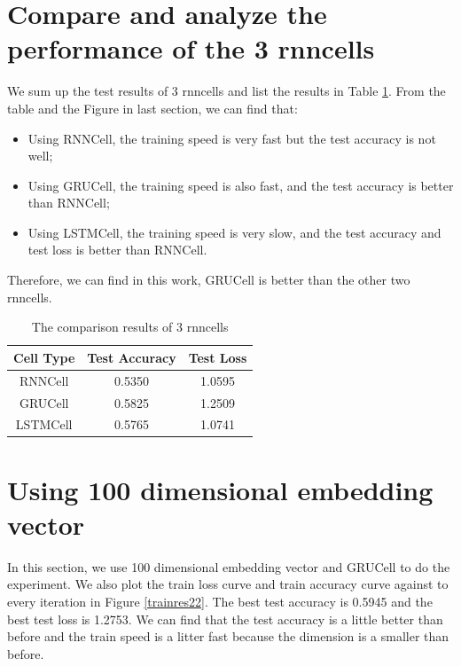 \documentclass{elegantbook}
\begin{document}

\section{Compare and analyze the performance of the 3 rnncells}
We sum up the test results of 3 rnncells and list the results in Table \ref{res1}. From the table and the Figure in last section, we can find that:
\begin{itemize}
	\item Using RNNCell, the training speed is very fast but the test accuracy is not well;
	\item Using GRUCell, the training speed is also fast, and the test accuracy is better than RNNCell;
	\item Using LSTMCell, the training speed is very slow, and the test accuracy and test loss is better than RNNCell.
\end{itemize}

Therefore, we can find in this work, GRUCell is better than the other two rnncells.

\begin{table}[!h]
	\centering\caption{\label{res1}The comparison results of 3 rnncells}
	\begin{tabular}{|c|c|c|}
		\hline
		Cell Type & Test Accuracy & Test Loss \\
		\hline
		RNNCell & 0.5350 & 1.0595 \\
		\hline
		GRUCell & 0.5825 & 1.2509 \\
		\hline
		LSTMCell & 0.5765 & 1.0741 \\
		\hline
	\end{tabular}
\end{table}

\section{Using 100 dimensional embedding vector}
In this section, we use 100 dimensional embedding vector and GRUCell to do the experiment. We also plot the train loss curve and train accuracy curve against to every iteration in Figure \ref{trainres22}. The best test accuracy is 0.5945 and the best test loss is 1.2753. We can find that the test accuracy is a little better than before and the train speed is a litter fast because the dimension is a smaller than before.
\end{document}
